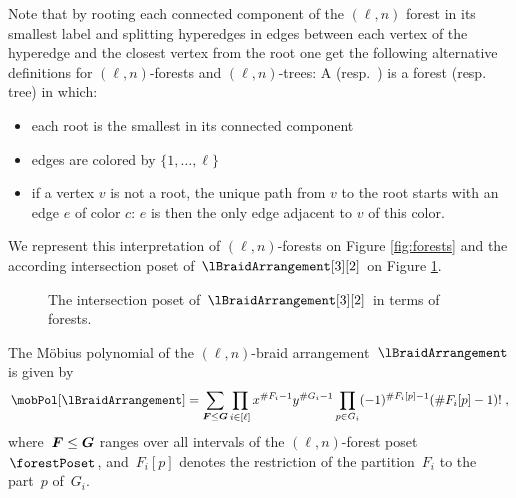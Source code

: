 \begin{remark}
Note that by rooting each connected component of the $(\ell,n)$ forest in its smallest label and splitting hyperedges in edges between each vertex of the hyperedge and the closest vertex from the root one get the following alternative definitions for  $(\ell,n)$-forests and  $(\ell,n)$-trees:
A  (resp.~) is a forest (resp. tree) in which:
\begin{itemize}
\item each root is the smallest in its connected component 
\item edges are colored by $\{1, \ldots, \ell\}$ 
\item if a vertex $v$ is not a root, the unique path from $v$ to the root starts with an edge $e$ of color $c$: $e$ is then the only edge adjacent to $v$ of this color. 
\end{itemize}
We represent this interpretation of $(\ell,n)$-forests on Figure \ref{fig:forests} and the according intersection poset of $\lBraidArrangement[3][2]$ on Figure \ref{IntPosB23}. 
\end{remark}

\begin{figure}

\centering
{}
\caption{The intersection poset of $\lBraidArrangement[3][2]$ in terms of forests. \label{IntPosB23}}
\end{figure}


\begin{theorem}
\label{thm:MobiusPolynomial}
The M\"obius polynomial of the $(\ell,n)$-braid arrangement~$\lBraidArrangement$ is given by
\[
\mobPol[\lBraidArrangement] = \sum_{\b{F} \le \b{G}} \prod_{i \in [\ell]} x^{\#F_i-1} y^{\#G_i-1} \prod_{p \in G_i} (-1)^{\#F_i[p]-1} (\# F_i[p]-1)! \; ,
\]
where~$\boldsymbol{F} \le \boldsymbol{G}$ ranges over all intervals of the $(\ell,n)$-forest poset~$\forestPoset$, and~$F_i[p]$ denotes the restriction of the partition~$F_i$ to the part~$p$ of~$G_i$.
\end{theorem}

